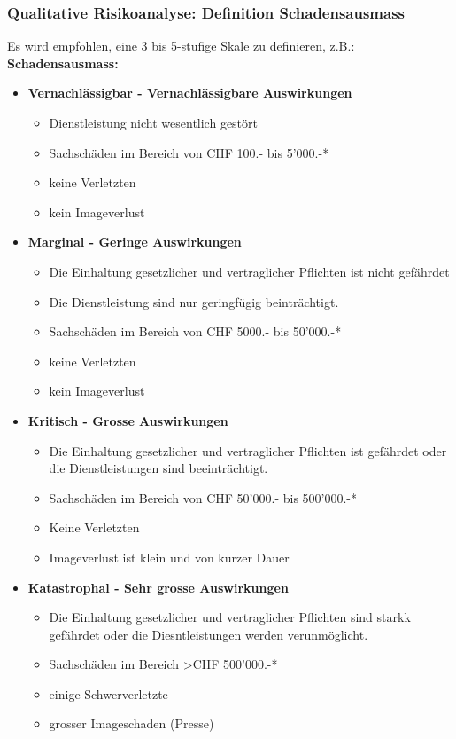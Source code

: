 \documentclass[10pt,a4paper]{article}
\begin{document}
\subsubsection*{Qualitative Risikoanalyse: Definition Schadensausmass} Es wird empfohlen, eine 3 bis 5-stufige Skale zu definieren, z.B.: \\
\textbf{Schadensausmass:}
\begin{itemize}[noitemsep,topsep=0pt,leftmargin=*]
    \item \textbf{Vernachlässigbar - Vernachlässigbare Auswirkungen}
    \begin{itemize}[noitemsep,topsep=0pt,leftmargin=*]
        \item Dienstleistung nicht wesentlich gestört
        \item Sachschäden im Bereich von CHF 100.- bis 5'000.-*
        \item keine Verletzten
        \item kein Imageverlust
    \end{itemize}
    \item \textbf{Marginal - Geringe Auswirkungen}
    \begin{itemize}[noitemsep,topsep=0pt,leftmargin=*]
        \item Die Einhaltung gesetzlicher und vertraglicher Pflichten ist nicht gefährdet
        \item Die Dienstleistung sind nur geringfügig beinträchtigt.
        \item Sachschäden im  Bereich von CHF 5000.- bis 50'000.-*
        \item keine Verletzten
        \item kein Imageverlust
    \end{itemize}
    \item \textbf{Kritisch - Grosse Auswirkungen}
    \begin{itemize}[noitemsep,topsep=0pt,leftmargin=*]
        \item Die Einhaltung gesetzlicher und vertraglicher Pflichten ist gefährdet oder die Dienstleistungen sind beeinträchtigt.
        \item Sachschäden im Bereich von CHF 50'000.- bis  500'000.-*
        \item Keine Verletzten
        \item Imageverlust ist klein und von kurzer Dauer
    \end{itemize}
    \item \textbf{Katastrophal - Sehr grosse Auswirkungen}
    \begin{itemize}[noitemsep,topsep=0pt,leftmargin=*]
        \item Die Einhaltung gesetzlicher und vertraglicher Pflichten sind starkk gefährdet oder die Diesntleistungen werden verunmöglicht.
        \item Sachschäden im Bereich \textgreater CHF 500'000.-*
        \item einige Schwerverletzte
        \item grosser Imageschaden (Presse)
    \end{itemize}
\end{itemize}
\end{document}
